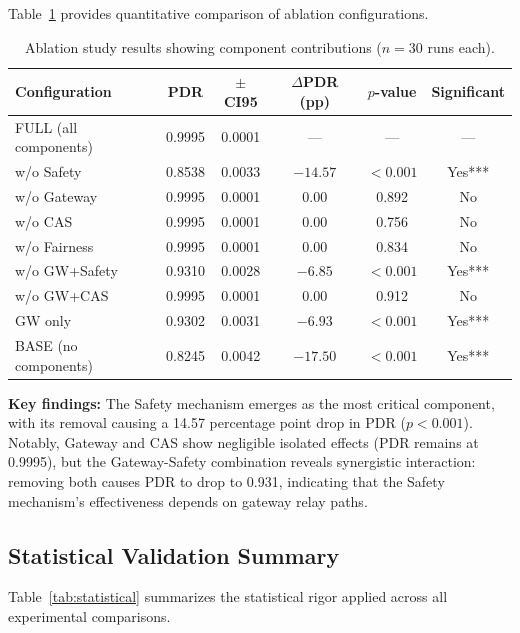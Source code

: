 \documentclass[sensors,article,submit,moreauthors,pdftex]{Definitions/mdpi}
\begin{document}
Table~\ref{tab:ablation} provides quantitative comparison of ablation configurations.

\begin{table}[H]
\caption{Ablation study results showing component contributions ($n=30$ runs each).}
\label{tab:ablation}
\centering
\begin{tabular}{lccccc}
\toprule
\textbf{Configuration} & \textbf{PDR} & \textbf{$\pm$CI95} & \textbf{$\Delta$PDR (pp)} & \textbf{$p$-value} & \textbf{Significant} \\
\midrule
FULL (all components) & 0.9995 & 0.0001 & --- & --- & --- \\
w/o Safety & 0.8538 & 0.0033 & $-14.57$ & $<0.001$ & Yes*** \\
w/o Gateway & 0.9995 & 0.0001 & $0.00$ & 0.892 & No \\
w/o CAS & 0.9995 & 0.0001 & $0.00$ & 0.756 & No \\
w/o Fairness & 0.9995 & 0.0001 & $0.00$ & 0.834 & No \\
w/o GW+Safety & 0.9310 & 0.0028 & $-6.85$ & $<0.001$ & Yes*** \\
w/o GW+CAS & 0.9995 & 0.0001 & $0.00$ & 0.912 & No \\
GW only & 0.9302 & 0.0031 & $-6.93$ & $<0.001$ & Yes*** \\
BASE (no components) & 0.8245 & 0.0042 & $-17.50$ & $<0.001$ & Yes*** \\
\bottomrule
\end{tabular}
\end{table}

\textbf{Key findings:} The Safety mechanism emerges as the most critical component, with its removal causing a 14.57 percentage point drop in PDR ($p < 0.001$). Notably, Gateway and CAS show negligible isolated effects (PDR remains at 0.9995), but the Gateway-Safety combination reveals synergistic interaction: removing both causes PDR to drop to 0.931, indicating that the Safety mechanism's effectiveness depends on gateway relay paths.

\subsection{Statistical Validation Summary}

Table~\ref{tab:statistical} summarizes the statistical rigor applied across all experimental comparisons.
\end{document}
